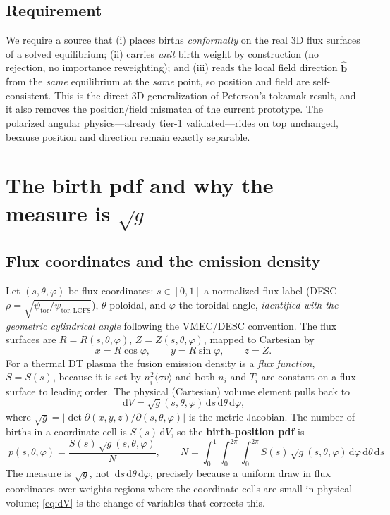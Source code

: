 \documentclass[11pt]{article}
\newcommand{\sg}{\sqrt{g}}
\newcommand{\bhat}{\hat{\mathbf{b}}}
\newcommand{\dd}{\,\mathrm{d}}
\begin{document}
\subsection{Requirement}

We require a source that (i) places births \emph{conformally} on the real 3D flux
surfaces of a solved equilibrium; (ii) carries \emph{unit} birth weight by
construction (no rejection, no importance reweighting); and (iii) reads the local
field direction $\bhat$ from the \emph{same} equilibrium at the \emph{same} point,
so position and field are self-consistent. This is the direct 3D generalization of
Peterson's tokamak result, and it also removes the position/field mismatch of the
current prototype. The polarized angular physics---already tier-1 validated---rides
on top unchanged, because position and direction remain exactly separable.

\section{The birth pdf and why the measure is $\sg$}
\label{sec:physics}

\subsection{Flux coordinates and the emission density}

Let $(s,\theta,\varphi)$ be flux coordinates: $s\in[0,1]$ a normalized flux label
(DESC $\rho=\sqrt{\psi_{\mathrm{tor}}/\psi_{\mathrm{tor,LCFS}}}$), $\theta$
poloidal, and $\varphi$ the toroidal angle, \emph{identified with the geometric
cylindrical angle} following the VMEC/DESC convention. The flux surfaces are
$R=R(s,\theta,\varphi)$, $Z=Z(s,\theta,\varphi)$, mapped to Cartesian by
\begin{equation}
x=R\cos\varphi,\qquad y=R\sin\varphi,\qquad z=Z .
\label{eq:cyl2cart}
\end{equation}
For a thermal DT plasma the fusion emission density is a \emph{flux function},
$S=S(s)$, because it is set by $n_i^2\langle\sigma v\rangle$ and both $n_i$ and
$T_i$ are constant on a flux surface to leading order. The physical (Cartesian)
volume element pulls back to
\begin{equation}
\dd V=\sg(s,\theta,\varphi)\dd s\dd\theta\dd\varphi ,
\label{eq:dV}
\end{equation}
where $\sg=\big|\det\partial(x,y,z)/\partial(s,\theta,\varphi)\big|$ is the metric
Jacobian. The number of births in a coordinate cell is $S(s)\dd V$, so the
\textbf{birth-position pdf} is
\begin{equation}
\boxed{\;
p(s,\theta,\varphi)=\frac{S(s)\,\sg(s,\theta,\varphi)}{N},\qquad
N=\int_0^1\!\!\int_0^{2\pi}\!\!\int_0^{2\pi}
S(s)\,\sg(s,\theta,\varphi)\dd\varphi\dd\theta\dd s\; }
\label{eq:pdf}
\end{equation}
The measure is $\sg$, not $\dd s\dd\theta\dd\varphi$, precisely because a uniform
draw in flux coordinates over-weights regions where the coordinate cells are small
in physical volume; \eqref{eq:dV} is the change of variables that corrects this.
\end{document}
